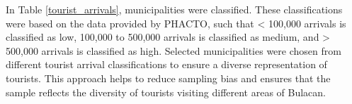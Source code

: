 
In Table \ref{tourist_arrivals}, municipalities were classified. These classifications were based on the data provided by PHACTO, such that < 100,000 arrivals is classified as low, 100,000 to 500,000 arrivals is classified as medium, and > 500,000 arrivals is classified as high. Selected municipalities were chosen from different tourist arrival classifications to ensure a diverse representation of tourists. This approach helps to reduce sampling bias and ensures that the sample reflects the diversity of tourists visiting different areas of Bulacan.

